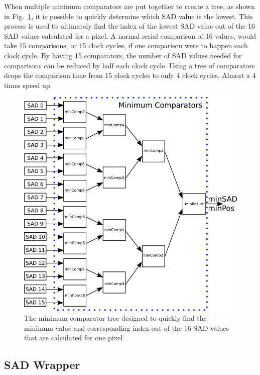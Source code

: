 When multiple minimum comparators are put together to create a tree, as shown in Fig.~\ref{fig:minComp}, it is possible to quickly determine which SAD value is the lowest. This process is used to ultimately find the index of the lowest SAD value out of the 16 SAD values calculated for a pixel. A normal serial comparison of 16 values, would take 15 comparisons, or 15 clock cycles, if one comparison were to happen each clock cycle. By having 15 comparators, the number of SAD values needed for comparisons can be reduced by half each clock cycle. Using a tree of comparators drops the comparison time from 15 clock cycles to only 4 clock cycles. Almost a 4 times speed up.

\begin{figure}[h]
	\begin{center}
		\includegraphics[width=150mm]{figures/minComparator.png}
		\captionfonts
		\caption{The minimum comparator tree designed to quickly find the minimum value and corresponding index out of the 16 SAD values that are calculated for one pixel.}
		\label{fig:minComp}
	\end{center}
\end{figure}


\subsection{SAD Wrapper}

